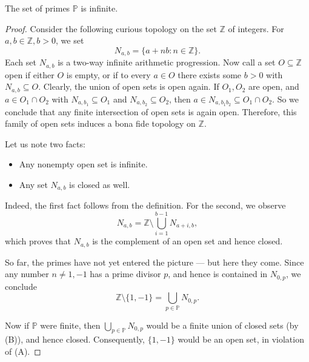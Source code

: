 \begin{theorem}
    \label{thm:fifth_proof}
    \leanok
    The set of primes \(\mathbb{P}\) is infinite.
\end{theorem}
\begin{proof}
    Consider the following curious topology on the set \(\mathbb{Z}\) of integers. For \(a, b \in \mathbb{Z}, b > 0\), we set
    \[
    N_{a,b} = \{a + nb : n \in \mathbb{Z}\}.
    \]
    Each set \(N_{a,b}\) is a two-way infinite arithmetic progression.
    Now call a set \(O \subseteq \mathbb{Z}\) open if either \(O\) is empty, or if to every \(a \in O\) there exists some \(b > 0\) with \(N_{a,b} \subseteq O\).
    Clearly, the union of open sets is open again. If \(O_1, O_2\) are open, and \(a \in O_1 \cap O_2\) with \(N_{a,b_1} \subseteq O_1\) and \(N_{a,b_2} \subseteq O_2\),
    then \(a \in N_{a, b_1 b_2} \subseteq O_1 \cap O_2\). So we conclude that any finite intersection of open sets is again open.
    Therefore, this family of open sets induces a bona fide topology on \(\mathbb{Z}\).

    Let us note two facts:
    \begin{itemize}
        \item[(A)] Any nonempty open set is infinite.
        \item[(B)] Any set \(N_{a,b}\) is closed as well.
    \end{itemize}

    Indeed, the first fact follows from the definition. For the second, we observe
    \[
    N_{a,b} = \mathbb{Z} \setminus \bigcup_{i=1}^{b-1} N_{a+i,b},
    \]
    which proves that \(N_{a,b}\) is the complement of an open set and hence closed.

    So far, the primes have not yet entered the picture — but here they come.
    Since any number \(n \neq 1, -1\) has a prime divisor \(p\), and hence is contained in \(N_{0,p}\), we conclude
    \[
    \mathbb{Z} \setminus \{1, -1\} = \bigcup_{p \in \mathbb{P}} N_{0,p}.
    \]

    Now if \(\mathbb{P}\) were finite, then \(\bigcup_{p \in \mathbb{P}} N_{0,p}\) would be a finite union of closed sets (by (B)), and hence closed.
    Consequently, \(\{1, -1\}\) would be an open set, in violation of (A).
\end{proof}

